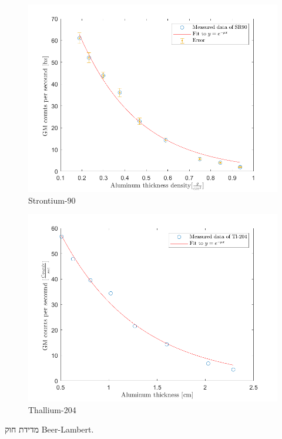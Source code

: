 \documentclass{article}
\begin{document}
\begin{graph}[H]
    \centering
    \begin{subfigure}[b]{0.49\textwidth}
    	\centering
    	\includegraphics[width=\textwidth]{SR90.png}
    	\caption{\textenglish{Strontium-90}}
    	\label{graph:decay_SR90}
    \end{subfigure}
    \hfill
    \begin{subfigure}[b]{0.49\textwidth}
    	\centering
    	\includegraphics[width=\textwidth]{Tl-204.png}
        \caption{\textenglish{Thallium-204}}
        \label{graph:decay_Tl-204}
    \end{subfigure}
    \caption{
    מדידת חוק
    \textenglish{Beer-Lambert}.
    }
    \label{graph:beer-lambert}
\end{graph}
\end{document}
